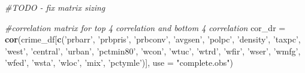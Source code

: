 \documentclass[]{article}
\newenvironment{Shaded}{\begin{snugshade}}{\end{snugshade}}
\newcommand{\KeywordTok}[1]{\textcolor[rgb]{0.13,0.29,0.53}{\textbf{#1}}}
\newcommand{\DataTypeTok}[1]{\textcolor[rgb]{0.13,0.29,0.53}{#1}}
\newcommand{\StringTok}[1]{\textcolor[rgb]{0.31,0.60,0.02}{#1}}
\newcommand{\CommentTok}[1]{\textcolor[rgb]{0.56,0.35,0.01}{\textit{#1}}}
\newcommand{\NormalTok}[1]{#1}
\begin{document}
\begin{Shaded}
\begin{Highlighting}[]
\CommentTok{#TODO - fix matrix sizing}

\CommentTok{#correlation matrix for top 4 correlation and bottom 4 correlation}
\NormalTok{cor_dr =}\StringTok{ }\KeywordTok{cor}\NormalTok{(crime_df[}\KeywordTok{c}\NormalTok{(}\StringTok{'prbarr'}\NormalTok{,}
                        \StringTok{'prbpris'}\NormalTok{,}
                        \StringTok{'prbconv'}\NormalTok{,}
                        \StringTok{'avgsen'}\NormalTok{,}
                        \StringTok{'polpc'}\NormalTok{,}
                        \StringTok{'density'}\NormalTok{,}
                        \StringTok{'taxpc'}\NormalTok{,}
                        \StringTok{'west'}\NormalTok{,}
                        \StringTok{'central'}\NormalTok{,}
                        \StringTok{'urban'}\NormalTok{,}
                        \StringTok{'pctmin80'}\NormalTok{,}
                        \StringTok{'wcon'}\NormalTok{,}
                        \StringTok{'wtuc'}\NormalTok{,}
                        \StringTok{'wtrd'}\NormalTok{,}
                        \StringTok{'wfir'}\NormalTok{,}
                        \StringTok{'wser'}\NormalTok{,}
                        \StringTok{'wmfg'}\NormalTok{,}
                        \StringTok{'wfed'}\NormalTok{,}
                        \StringTok{'wsta'}\NormalTok{,}
                        \StringTok{'wloc'}\NormalTok{,}
                        \StringTok{'mix'}\NormalTok{,}
                        \StringTok{'pctymle'}\NormalTok{)],}
              \DataTypeTok{use =} \StringTok{"complete.obs"}\NormalTok{)}


\end{Highlighting}
\end{Shaded}
\end{document}
